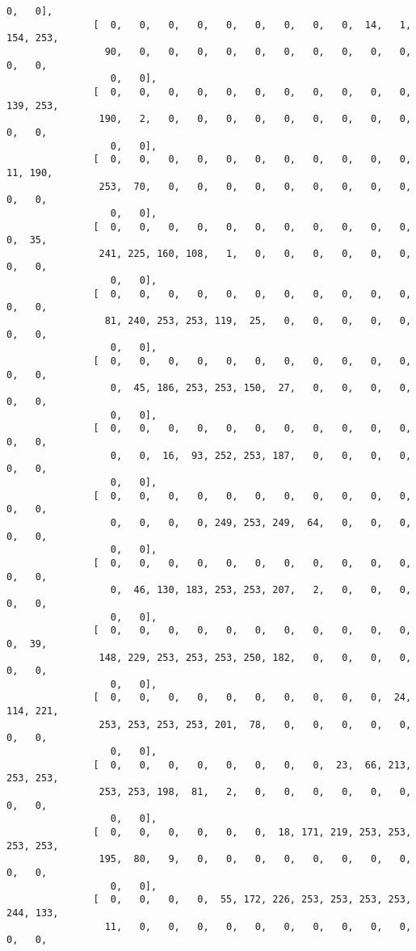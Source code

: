 \documentclass[11pt]{article}
\begin{document}
\begin{Verbatim}[commandchars=\\\{\}]
                  0,   0],
               [  0,   0,   0,   0,   0,   0,   0,   0,   0,  14,   1, 154, 253,
                 90,   0,   0,   0,   0,   0,   0,   0,   0,   0,   0,   0,   0,
                  0,   0],
               [  0,   0,   0,   0,   0,   0,   0,   0,   0,   0,   0, 139, 253,
                190,   2,   0,   0,   0,   0,   0,   0,   0,   0,   0,   0,   0,
                  0,   0],
               [  0,   0,   0,   0,   0,   0,   0,   0,   0,   0,   0,  11, 190,
                253,  70,   0,   0,   0,   0,   0,   0,   0,   0,   0,   0,   0,
                  0,   0],
               [  0,   0,   0,   0,   0,   0,   0,   0,   0,   0,   0,   0,  35,
                241, 225, 160, 108,   1,   0,   0,   0,   0,   0,   0,   0,   0,
                  0,   0],
               [  0,   0,   0,   0,   0,   0,   0,   0,   0,   0,   0,   0,   0,
                 81, 240, 253, 253, 119,  25,   0,   0,   0,   0,   0,   0,   0,
                  0,   0],
               [  0,   0,   0,   0,   0,   0,   0,   0,   0,   0,   0,   0,   0,
                  0,  45, 186, 253, 253, 150,  27,   0,   0,   0,   0,   0,   0,
                  0,   0],
               [  0,   0,   0,   0,   0,   0,   0,   0,   0,   0,   0,   0,   0,
                  0,   0,  16,  93, 252, 253, 187,   0,   0,   0,   0,   0,   0,
                  0,   0],
               [  0,   0,   0,   0,   0,   0,   0,   0,   0,   0,   0,   0,   0,
                  0,   0,   0,   0, 249, 253, 249,  64,   0,   0,   0,   0,   0,
                  0,   0],
               [  0,   0,   0,   0,   0,   0,   0,   0,   0,   0,   0,   0,   0,
                  0,  46, 130, 183, 253, 253, 207,   2,   0,   0,   0,   0,   0,
                  0,   0],
               [  0,   0,   0,   0,   0,   0,   0,   0,   0,   0,   0,   0,  39,
                148, 229, 253, 253, 253, 250, 182,   0,   0,   0,   0,   0,   0,
                  0,   0],
               [  0,   0,   0,   0,   0,   0,   0,   0,   0,   0,  24, 114, 221,
                253, 253, 253, 253, 201,  78,   0,   0,   0,   0,   0,   0,   0,
                  0,   0],
               [  0,   0,   0,   0,   0,   0,   0,   0,  23,  66, 213, 253, 253,
                253, 253, 198,  81,   2,   0,   0,   0,   0,   0,   0,   0,   0,
                  0,   0],
               [  0,   0,   0,   0,   0,   0,  18, 171, 219, 253, 253, 253, 253,
                195,  80,   9,   0,   0,   0,   0,   0,   0,   0,   0,   0,   0,
                  0,   0],
               [  0,   0,   0,   0,  55, 172, 226, 253, 253, 253, 253, 244, 133,
                 11,   0,   0,   0,   0,   0,   0,   0,   0,   0,   0,   0,   0,

\end{Verbatim}
\end{document}
